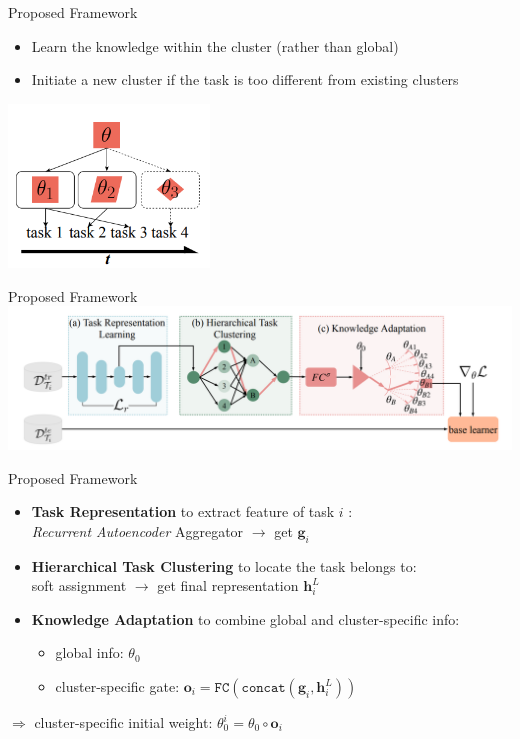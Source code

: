 \documentclass{beamer}
\begin{document}
\begin{frame}{Proposed Framework}
  \begin{itemize}
    \item Learn the knowledge within the cluster (rather than global)
    \item Initiate a new cluster if the task is too different from existing clusters
  \end{itemize}
    \center \includegraphics[width=0.4\textwidth]{fig/p3-specific.png}
\end{frame}

\begin{frame}{Proposed Framework}
    \center \includegraphics[width=\textwidth]{fig/p3-arch.png}
\end{frame}

\begin{frame}{Proposed Framework}
  \begin{itemize}
    \item \textbf{Task Representation} to extract feature of task $i$ :\\ \textit{Recurrent Autoencoder} Aggregator $\rightarrow$ get $\mathbf{g}_i$
    \item \textbf{Hierarchical Task Clustering} to locate the task belongs to:\\ soft assignment $\rightarrow$ get final representation $\mathbf{h}_i^L$ 
    \item \textbf{Knowledge Adaptation} to combine global and cluster-specific info: \\
      \begin{itemize}
        \item global info: $\theta_0$
        \item cluster-specific gate: $\mathbf{o}_i = \texttt{FC}(\texttt{concat}(\mathbf{g}_i,\mathbf{h}_i^L))$
      \end{itemize}
  \end{itemize}
  \center $\Rightarrow$ cluster-specific initial weight: $\theta_0^i = \theta_0 \circ \mathbf{o}_i$
\end{frame}
\end{document}
